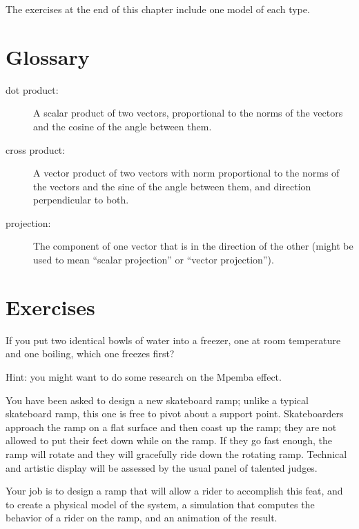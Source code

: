 \documentclass{book}
\begin{document}
The exercises at the end of this chapter include one model of
each type.


\section{Glossary}

\begin{description}

\item[dot product:] A scalar product of two vectors, proportional
to the norms of the vectors and the cosine of the angle between them.

\item[cross product:] A vector product of two vectors with norm
proportional to the norms of the vectors and the sine of the angle
between them, and direction perpendicular to both.

\item[projection:] The component of one vector that is in the
direction of the other (might be used to mean ``scalar projection'' or
``vector projection'').

\end{description}


\section{Exercises}

\begin{ex}
If you put two identical bowls of water into a freezer, one at
room temperature and one boiling, which one freezes first?

Hint: you might want to do some research on the Mpemba effect.

\end{ex}

\begin{ex}
You have been asked to design a new skateboard ramp; unlike a typical
skateboard ramp, this one is free to pivot about a support point.
Skateboarders approach the ramp on a flat surface and then coast up
the ramp; they are not allowed to put their feet down while on the
ramp.  If they go fast enough, the ramp will rotate and they will
gracefully ride down the rotating ramp.  Technical and artistic
display will be assessed by the usual panel of talented judges.

Your job is to design a ramp that will allow a rider to accomplish
this feat, and to create a physical model of the system, a
simulation that computes the behavior of a rider on the ramp, and an
animation of the result.
\end{ex}
\end{document}
